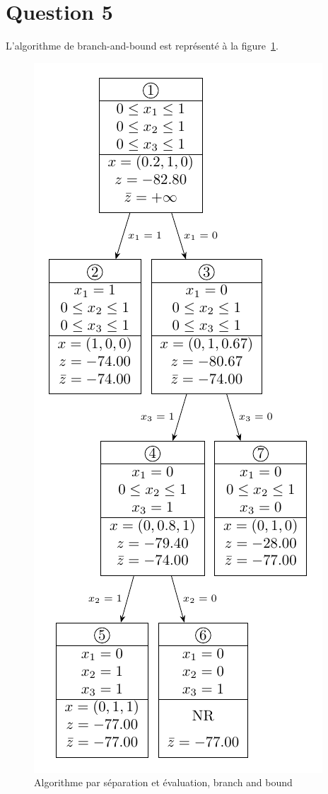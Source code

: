\section{Question 5}
L’algorithme de branch-and-bound est représenté à la figure~\ref{arbre5}.

\begin{figure}[htb]
	\caption{Algorithme par séparation et évaluation, branch and bound}
	\label{arbre5}
	\centering
	\includegraphics[height=.98\textheight]{question/forest/5.pdf}
\end{figure}

